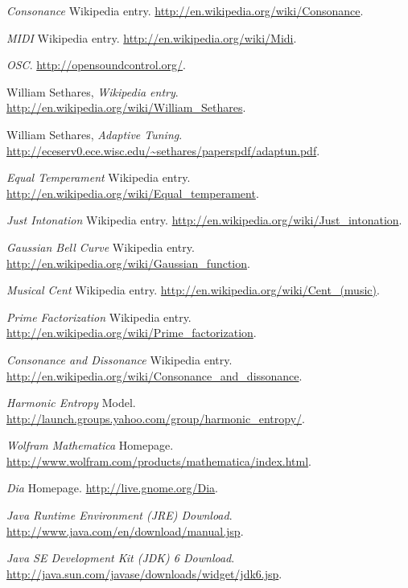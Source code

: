 \documentclass[12pt,a4paper,titlepage,oneside]{report}
\begin{document}
\begin{thebibliography}{99}

  \emph{Consonance} Wikipedia entry.
  \url{http://en.wikipedia.org/wiki/Consonance}.

  \emph{MIDI} Wikipedia entry.
  \url{http://en.wikipedia.org/wiki/Midi}.

  \emph{OSC}.
  \url{http://opensoundcontrol.org/}.
  
  William Sethares,
  \emph{Wikipedia entry}.
  \url{http://en.wikipedia.org/wiki/William_Sethares}.

  William Sethares,
  \emph{Adaptive Tuning}.
  \url{http://eceserv0.ece.wisc.edu/~sethares/paperspdf/adaptun.pdf}.

  \emph{Equal Temperament} Wikipedia entry.
  \url{http://en.wikipedia.org/wiki/Equal_temperament}.

  \emph{Just Intonation} Wikipedia entry.
  \url{http://en.wikipedia.org/wiki/Just_intonation}.

  \emph{Gaussian Bell Curve} Wikipedia entry.
  \url{http://en.wikipedia.org/wiki/Gaussian_function}.
  
  \emph{Musical Cent} Wikipedia entry.
  \url{http://en.wikipedia.org/wiki/Cent_(music)}.

  \emph{Prime Factorization} Wikipedia entry.
  \url{http://en.wikipedia.org/wiki/Prime_factorization}.

  \emph{Consonance and Dissonance} Wikipedia entry.
  \url{http://en.wikipedia.org/wiki/Consonance_and_dissonance}.

  \emph{Harmonic Entropy} Model.
  \url{http://launch.groups.yahoo.com/group/harmonic_entropy/}.

  \emph{Wolfram Mathematica} Homepage.
  \url{http://www.wolfram.com/products/mathematica/index.html}.

  \emph{Dia} Homepage.
  \url{http://live.gnome.org/Dia}.

  \emph{Java Runtime Environment (JRE) Download}.
  \url{http://www.java.com/en/download/manual.jsp}.

  \emph{Java SE Development Kit (JDK) 6 Download}.
  \url{http://java.sun.com/javase/downloads/widget/jdk6.jsp}.
  

\end{thebibliography}
\end{document}
